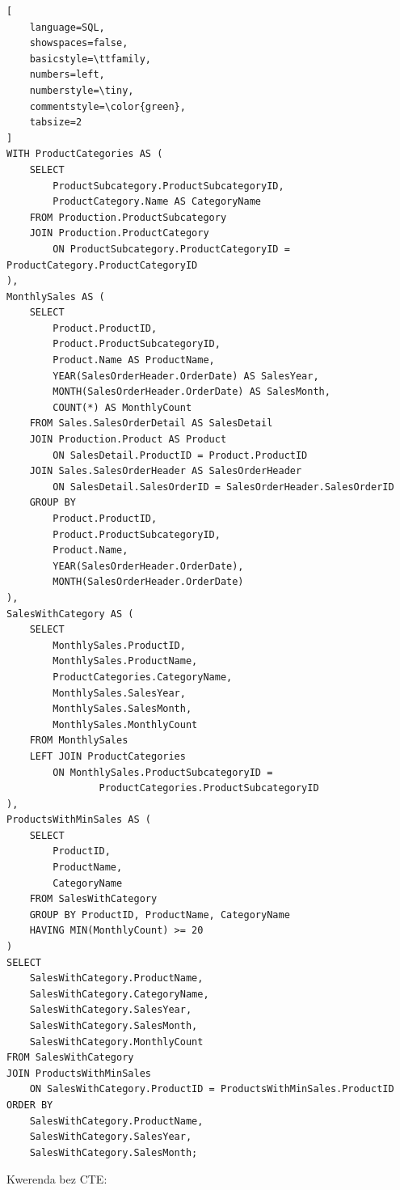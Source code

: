 \documentclass[a4paper,12pt]{article}
\begin{document}
{\small
\begin{lstlisting}[
	language=SQL,
	showspaces=false,
	basicstyle=\ttfamily,
	numbers=left,
	numberstyle=\tiny,
	commentstyle=\color{green},
	tabsize=2
]
WITH ProductCategories AS (
    SELECT 
        ProductSubcategory.ProductSubcategoryID,
        ProductCategory.Name AS CategoryName
    FROM Production.ProductSubcategory
    JOIN Production.ProductCategory 
        ON ProductSubcategory.ProductCategoryID = ProductCategory.ProductCategoryID
),
MonthlySales AS (
    SELECT 
        Product.ProductID,
        Product.ProductSubcategoryID,
        Product.Name AS ProductName,
        YEAR(SalesOrderHeader.OrderDate) AS SalesYear,
        MONTH(SalesOrderHeader.OrderDate) AS SalesMonth,
        COUNT(*) AS MonthlyCount
    FROM Sales.SalesOrderDetail AS SalesDetail
    JOIN Production.Product AS Product 
        ON SalesDetail.ProductID = Product.ProductID
    JOIN Sales.SalesOrderHeader AS SalesOrderHeader
        ON SalesDetail.SalesOrderID = SalesOrderHeader.SalesOrderID
    GROUP BY 
        Product.ProductID, 
        Product.ProductSubcategoryID,
        Product.Name, 
        YEAR(SalesOrderHeader.OrderDate), 
        MONTH(SalesOrderHeader.OrderDate)
),
SalesWithCategory AS (
    SELECT 
        MonthlySales.ProductID,
        MonthlySales.ProductName,
        ProductCategories.CategoryName,
        MonthlySales.SalesYear,
        MonthlySales.SalesMonth,
        MonthlySales.MonthlyCount
    FROM MonthlySales
    LEFT JOIN ProductCategories 
        ON MonthlySales.ProductSubcategoryID = 
				ProductCategories.ProductSubcategoryID
),
ProductsWithMinSales AS (
    SELECT 
        ProductID,
        ProductName,
        CategoryName
    FROM SalesWithCategory
    GROUP BY ProductID, ProductName, CategoryName
    HAVING MIN(MonthlyCount) >= 20
)
SELECT 
    SalesWithCategory.ProductName,
    SalesWithCategory.CategoryName,
    SalesWithCategory.SalesYear,
    SalesWithCategory.SalesMonth,
    SalesWithCategory.MonthlyCount
FROM SalesWithCategory
JOIN ProductsWithMinSales 
    ON SalesWithCategory.ProductID = ProductsWithMinSales.ProductID
ORDER BY 
	SalesWithCategory.ProductName, 
	SalesWithCategory.SalesYear, 
	SalesWithCategory.SalesMonth;
\end{lstlisting}}

Kwerenda bez CTE:
\end{document}
